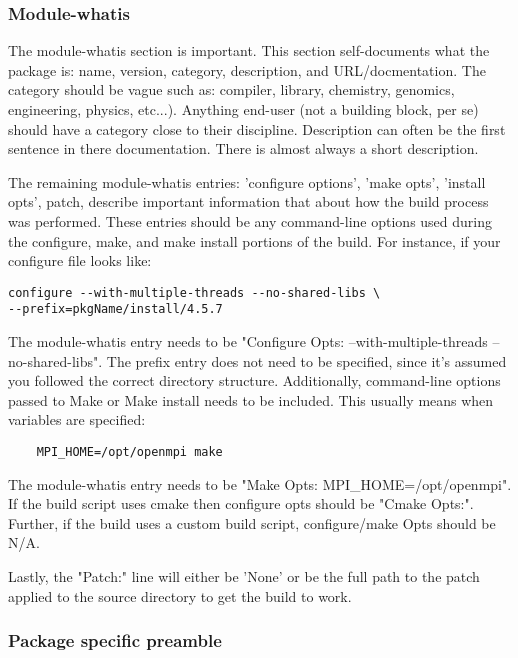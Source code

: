 \documentclass{article}
\begin{document}
\subsubsection{Module-whatis}

The module-whatis section is important.  This section self-documents what the 
package is: name, version, category, description, and URL/docmentation.  The 
category should be vague such as: compiler, library, chemistry, genomics, 
engineering, physics, etc...).  Anything end-user (not a building block, per 
se) should have a category close to their discipline.  Description can often be 
the first sentence in there documentation.  There is almost always a short 
description.

The remaining module-whatis entries: 'configure options', 'make opts', 'install 
opts', patch, describe important information that about how the build process 
was performed.  These entries should be any command-line options used during 
the configure, make, and make install portions of the build.  For instance, if 
your configure file looks like:

\begin{verbatim}
configure --with-multiple-threads --no-shared-libs \	
--prefix=pkgName/install/4.5.7
\end{verbatim}

\noindent The module-whatis entry needs to be "Configure Opts: 
--with-multiple-threads --no-shared-libs".  The prefix entry does not need to 
be specified, since it's assumed you followed the correct directory structure.  
Additionally, command-line options passed to Make or Make install needs to be 
included.  This usually means when variables are specified:

\begin{verbatim}
	MPI_HOME=/opt/openmpi make
\end{verbatim}

The module-whatis entry needs to be "Make Opts: MPI\_HOME=/opt/openmpi".  If 
the build script uses cmake then configure opts should be "Cmake Opts:".  
Further, if the build uses a custom build script, configure/make Opts should be 
N/A.

Lastly, the "Patch:" line will either be 'None' or be the full path to the 
patch applied to the source directory to get the build to work.

\subsubsection{Package specific preamble}
\end{document}
